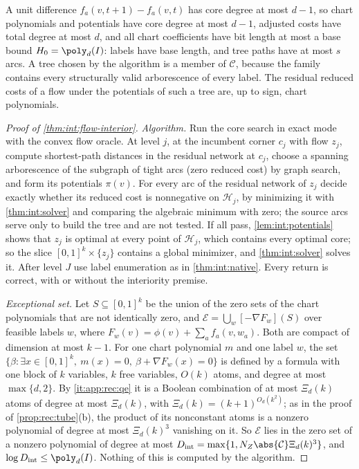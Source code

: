 A unit difference $f_a(v,t+1)-f_a(v,t)$ has core degree at most $d-1$, so chart
polynomials and potentials have core degree at most $d-1$, adjusted costs have
total degree at most $d$, and all chart coefficients have bit length at most a
base bound $H_0=\poly_d(I)$: labels have base length, and tree paths have at most
$s$ arcs. A tree chosen by the algorithm is a member of $\mathcal C$, because the
family contains every structurally valid arborescence of every label. The
residual reduced costs of a flow under the potentials of such a tree are, up to
sign, chart polynomials.

\begin{proof}[Proof of \cref{thm:int:flow-interior}]
\emph{Algorithm.} Run the core search in exact mode with the convex flow oracle.
At level $j$, at the incumbent corner $c_j$ with flow $z_j$, compute shortest-path
distances in the residual network at $c_j$, choose a spanning arborescence of the
subgraph of tight arcs (zero reduced cost) by graph search, and form its potentials
$\pi(v)$. For every arc of the residual network of $z_j$ decide exactly whether
its reduced cost is nonnegative on $\mathcal H_j$, by minimizing it with
\cref{thm:int:solver} and comparing the algebraic minimum with zero; the source
arcs serve only to build the tree and are not tested. If all pass, \cref{lem:int:potentials}
shows that $z_j$ is optimal at every point of $\mathcal H_j$, which contains every
optimal core; so the slice $[0,1]^k\times\{z_j\}$ contains a global minimizer, and
\cref{thm:int:solver} solves it. After level $J$ use label enumeration as in
\cref{thm:int:native}. Every return is correct, with or without the interiority
premise.

\emph{Exceptional set.} Let $S\subseteq[0,1]^k$ be the union of the zero sets of
the chart polynomials that are not identically zero, and
$\mathcal E=\bigcup_{w}[-\nabla F_w](S)$ over feasible labels $w$, where
$F_w(v)=\phi(v)+\sum_af_a(v,w_a)$. Both are compact of dimension at most $k-1$. For
one chart polynomial $m$ and one label $w$, the set $\{\beta:\exists x\in[0,1]^k,\
m(x)=0,\ \beta+\nabla F_w(x)=0\}$ is defined by a formula with one block of $k$
variables, $k$ free variables, $O(k)$ atoms, and degree at most $\max\{d,2\}$. By
\ref{it:app:rec:qe} it is a Boolean combination of at most $\Xi_d(k)$ atoms of degree
at most $\Xi_d(k)$, with $\Xi_d(k)=(k+1)^{O_d(k^2)}$; as in the proof of
\cref{prop:rec:tube}(b), the product of its nonconstant atoms is a nonzero
polynomial of degree at most $\Xi_d(k)^3$ vanishing on it. So $\mathcal E$ lies in the
zero set of a nonzero polynomial of degree at most
$D_{\rm int}=\max\{1,N_Z\abs{\mathcal C}\Xi_d(k)^3\}$, and $\log D_{\rm int}\le
\poly_d(I)$. Nothing of this is computed by the algorithm.


\end{proof}
